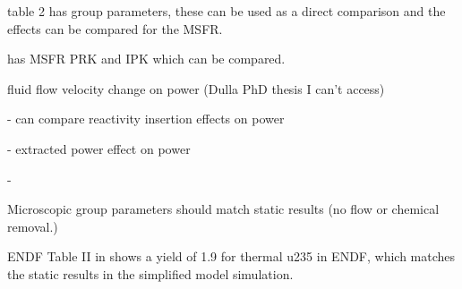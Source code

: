 \cite{li2015transient} table 2 has group parameters, these can be used as a direct comparison and the effects can be compared for the \gls{MSFR}.

\cite{merle2015physical} has MSFR PRK and IPK which can be compared.

fluid flow velocity change on power (Dulla PhD thesis I can't access)

\cite{laureau2015coupled} - can compare reactivity insertion effects on power

\cite{merle2015physical} - extracted power effect on power

\cite{mathieu2012new} - 


Microscopic group parameters \cite{leconte2020new, mills1991study, huynh2014calculation} should match static results (no flow or chemical removal.)

ENDF Table II in \cite{huynh2014calculation} shows a yield of 1.9 for thermal u235 in ENDF, which matches the static results in the simplified model simulation.